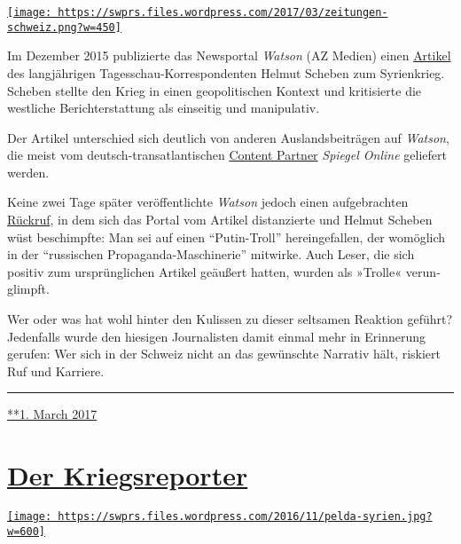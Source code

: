 \href{https://swprs.org/2017/03/01/das-gewuenschte-narrativ-ii/}{\texttt{[image: https://swprs.files.wordpress.com/2017/03/zeitungen-schweiz.png?w=450]}}

Im Dezember 2015 publi­zierte das News­portal \emph{Watson} (AZ Medien)
einen \href{https://www.watson.ch/!148360008}{Artikel} des lang­jährigen
Tages­schau-Kor­res­pon­denten Hel­mut Sche­­ben zum Syrien­krieg.
Scheben stellte den Krieg in einen geo­po­li­tischen Kontext und
kri­ti­sierte die westliche Be­richt­er­stattung als einseitig und
ma­ni­pu­la­tiv.

Der Artikel un­ter­schied sich deutlich von anderen Aus­lands­bei­trägen
auf \emph{Watson}, die meist vom deutsch-transatlantischen
\href{https://www.watson.ch/Corporate/articles/502582965-Spiegel-Online-und-watson-machen-gemeinsame-Sache}{Content
Partner} \emph{Spiegel Online} geliefert werden.

Keine zwei Tage später veröffentlichte \emph{Watson} jedoch einen
aufgebrachten \href{https://www.watson.ch/!491379853}{Rückruf}, in dem
sich das Portal vom Artikel distanzierte und Helmut Scheben wüst
beschimpfte: Man sei auf einen ``Putin-Troll'' herein­ge­fallen, der
wo­möglich in der ``russischen Propaganda-Maschinerie'' mit­wirke. Auch
Leser, die sich positiv zum ur­sprüng­lichen Artikel geäußert hatten,
wurden als »Trolle« verun­glimpft.

Wer oder was hat wohl hinter den Kulissen zu dieser selt­samen Reak­tion
geführt? Jeden­falls wurde den hiesigen Journa­listen damit einmal mehr
in Er­in­nerung gerufen: Wer sich in der Schweiz nicht an das
ge­wünschte Nar­ra­tiv hält, ris­kiert Ruf und Karriere.

\begin{center}\rule{0.5\linewidth}{\linethickness}\end{center}

\href{https://swprs.org/2017/03/01/das-gewuenschte-narrativ-ii/}{**1.
March 2017}

\hypertarget{der-kriegsreporter}{%
\section{\texorpdfstring{\href{https://swprs.org/2017/03/01/der-kriegsreporter/}{Der
Kriegsreporter}}{Der Kriegsreporter}}\label{der-kriegsreporter}}

\href{https://swprs.org/2017/03/01/der-kriegsreporter/}{\texttt{[image: https://swprs.files.wordpress.com/2016/11/pelda-syrien.jpg?w=600]}}

